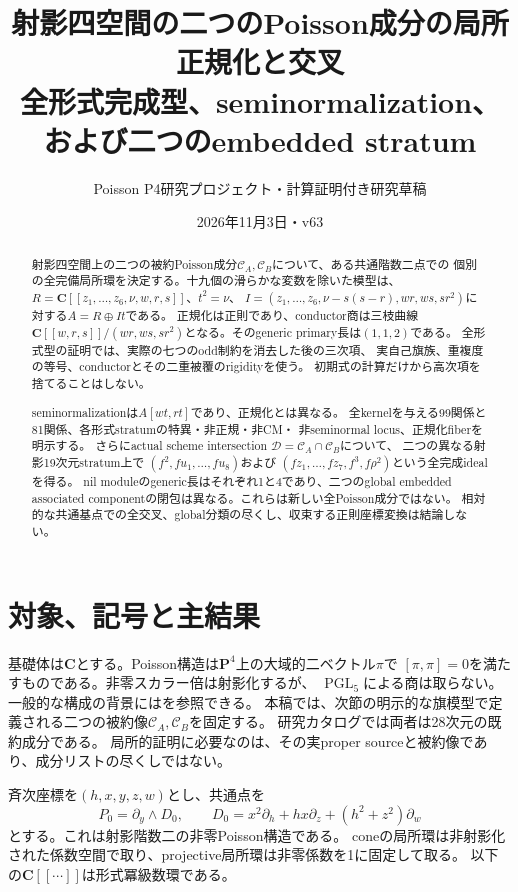 \documentclass[11pt,a4paper]{ltjsarticle}
\title{射影四空間の二つのPoisson成分の局所正規化と交叉\\[2mm]
\large 全形式完成型、seminormalization、および二つのembedded stratum}
\author{Poisson P4研究プロジェクト・計算証明付き研究草稿}
\date{2026年11月3日・v63}
\newcommand{\CC}{\mathbf C}
\newcommand{\PP}{\mathbf P}
\newcommand{\CA}{\mathcal C_A}
\newcommand{\CB}{\mathcal C_B}
\newcommand{\cD}{\mathcal D}
\newcommand{\PGL}{\operatorname{PGL}}
\theoremstyle{definition}
\theoremstyle{remark}
\begin{document}
\maketitle
\begin{abstract}
射影四空間上の二つの被約Poisson成分$\CA,\CB$について、ある共通階数二点での
個別の全完備局所環を決定する。十九個の滑らかな変数を除いた模型は、
$R=\CC[[z_1,\ldots,z_6,\nu,w,r,s]]$、$t^2=\nu$、
$I=(z_1,\ldots,z_6,\nu-s(s-r),wr,ws,sr^2)$に対する$A=R\oplus It$である。
正規化は正則であり、conductor商は三枝曲線
$\CC[[w,r,s]]/(wr,ws,sr^2)$となる。そのgeneric primary長は$(1,1,2)$である。
全形式型の証明では、実際の七つのodd制約を消去した後の三次項、
実自己旗族、重複度の等号、conductorとその二重被覆のrigidityを使う。
初期式の計算だけから高次項を捨てることはしない。

seminormalizationは$A[wt,rt]$であり、正規化とは異なる。
全kernelを与える99関係と81関係、各形式stratumの特異・非正規・非CM・
非seminormal locus、正規化fiberを明示する。
さらにactual scheme intersection $\cD=\CA\cap\CB$について、
二つの異なる射影19次元stratum上で
$(f^2,fu_1,\ldots,fu_8)$および
$(fz_1,\ldots,fz_7,f^3,f\rho^2)$という全完成idealを得る。
nil moduleのgeneric長はそれぞれ1と4であり、二つのglobal embedded associated
componentの閉包は異なる。これらは新しい全Poisson成分ではない。
相対的な共通基点での全交叉、global分類の尽くし、収束する正則座標変換は結論しない。
\end{abstract}

\section{対象、記号と主結果}

基礎体は$\CC$とする。Poisson構造は$\PP^4$上の大域的二ベクトル$\pi$で
$[\pi,\pi]=0$を満たすものである。非零スカラー倍は射影化するが、
$\PGL_5$による商は取らない。一般的な構成の背景には\cite{pym}を参照できる。
本稿では、次節の明示的な旗模型で定義される二つの被約像$\CA,\CB$を固定する。
研究カタログでは両者は28次元の既約成分である。
局所的証明に必要なのは、その実proper sourceと被約像であり、成分リストの尽くしではない。

斉次座標を$(h,x,y,z,w)$とし、共通点を
\begin{equation}\label{eq:P0}
 P_0=\partial_y\wedge D_0,\qquad
 D_0=x^2\partial_h+hx\partial_z+(h^2+z^2)\partial_w
\end{equation}
とする。これは射影階数二の非零Poisson構造である。
coneの局所環は非射影化された係数空間で取り、projective局所環は非零係数を1に固定して取る。
以下の$\CC[[\cdots]]$は形式冪級数環である。
\end{document}
